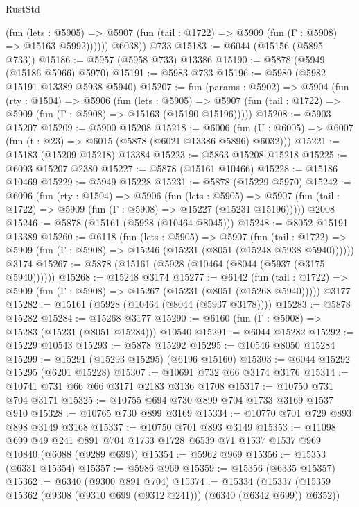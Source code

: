 \begin{lexlean}{RustStd}
\begin{coremodule}
              (fun (lets : @5905) =>
              @5907 (fun (tail : @1722) => @5909 (fun (Γ : @5908) => @15163 @5992))))))
        @6038))
    @733
@15183 := @6044 (@15156 (@5895 @733))
@15186 := @5957 (@5958 @733) @13386
@15190 := @5878 (@5949 (@15186 @5966) @5970)
@15191 := @5983 @733
@15196 := @5980 (@5982 @15191 @13389 @5938 @5940)
@15207 := fun (params : @5902) =>
  @5904
    (fun (rty : @1504) =>
    @5906
      (fun (lets : @5905) =>
      @5907 (fun (tail : @1722) => @5909 (fun (Γ : @5908) => @15163 (@15190 @15196)))))
@15208 := @5903 @15207
@15209 := @5900 @15208
@15218 := @6006
    (fun (U : @6005) => @6007 (fun (t : @23) => @6015 (@5878 (@6021 @13386 @5896) @6032)))
@15221 := @15183 (@15209 @15218) @13384
@15223 := @5863 @15208 @15218
@15225 := @6093 @15207 @2380
@15227 := @5878 (@15161 @10466)
@15228 := @15186 @10469
@15229 := @5949 @15228
@15231 := @5878 (@15229 @5970)
@15242 := @6096
    (fun (rty : @1504) =>
    @5906
      (fun (lets : @5905) =>
      @5907 (fun (tail : @1722) => @5909 (fun (Γ : @5908) => @15227 (@15231 @15196)))))
    @2008
@15246 := @5878 (@15161 (@5928 (@10464 @8045)))
@15248 := @8052 @15191 @13389
@15260 := @6118
    (fun (lets : @5905) =>
    @5907
      (fun (tail : @1722) =>
      @5909 (fun (Γ : @5908) => @15246 (@15231 (@8051 (@15248 @5938 @5940))))))
    @3174
@15267 := @5878 (@15161 (@5928 (@10464 (@8044 (@5937 (@3175 @5940))))))
@15268 := @15248 @3174
@15277 := @6142
    (fun (tail : @1722) => @5909 (fun (Γ : @5908) => @15267 (@15231 (@8051 (@15268 @5940)))))
    @3177
@15282 := @15161 (@5928 (@10464 (@8044 (@5937 @3178))))
@15283 := @5878 @15282
@15284 := @15268 @3177
@15290 := @6160 (fun (Γ : @5908) => @15283 (@15231 (@8051 @15284))) @10540
@15291 := @6044 @15282
@15292 := @15229 @10543
@15293 := @5878 @15292
@15295 := @10546 @8050 @15284
@15299 := @15291 (@15293 @15295) (@6196 @15160)
@15303 := @6044 @15292 @15295 (@6201 @15228)
@15307 := @10691 @732 @66 @3174 @3176
@15314 := @10741 @731 @66 @66 @3171 @2183 @3136 @1708
@15317 := @10750 @731 @704 @3171
@15325 := @10755 @694 @730 @899 @704 @1733 @3169 @1537 @910
@15328 := @10765 @730 @899 @3169
@15334 := @10770 @701 @729 @893 @898 @3149 @3168
@15337 := @10750 @701 @893 @3149
@15353 := @11098
    @699
    @49
    @241
    @891
    @704
    @1733
    @1728
    @6539
    @71
    @1537
    @1537
    @969
    @10840
    (@6088 (@9289 @699))
@15354 := @5962 @969
@15356 := @15353 (@6331 @15354)
@15357 := @5986 @969
@15359 := @15356 (@6335 @15357)
@15362 := @6340 (@9300 @891 @704)
@15374 := @15334
    (@15337 (@15359 @15362 (@9308 (@9310 @699 (@9312 @241))) (@6340 (@6342 @699)) @6352))

\end{coremodule}
\end{lexlean}
